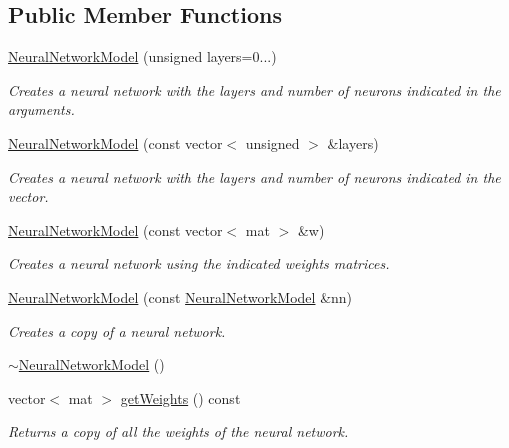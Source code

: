 \subsection*{Public Member Functions}
\begin{DoxyCompactItemize}
\item 
\hyperlink{classhappyml_1_1NeuralNetworkModel_a2ba8add6f01ebf3824967c43754ba96b}{Neural\+Network\+Model} (unsigned layers=0...)
\begin{DoxyCompactList}\small\item\em Creates a neural network with the layers and number of neurons indicated in the arguments. \end{DoxyCompactList}\item 
\hyperlink{classhappyml_1_1NeuralNetworkModel_a9db88c5a5fd88ab871f8237aab03b5ad}{Neural\+Network\+Model} (const vector$<$ unsigned $>$ \&layers)
\begin{DoxyCompactList}\small\item\em Creates a neural network with the layers and number of neurons indicated in the vector. \end{DoxyCompactList}\item 
\hyperlink{classhappyml_1_1NeuralNetworkModel_ad5359ce00a00346dab8433767f77988d}{Neural\+Network\+Model} (const vector$<$ mat $>$ \&w)
\begin{DoxyCompactList}\small\item\em Creates a neural network using the indicated weights matrices. \end{DoxyCompactList}\item 
\hyperlink{classhappyml_1_1NeuralNetworkModel_adadfa82c7b452789822dcb94ae5055d3}{Neural\+Network\+Model} (const \hyperlink{classhappyml_1_1NeuralNetworkModel}{Neural\+Network\+Model} \&nn)
\begin{DoxyCompactList}\small\item\em Creates a copy of a neural network. \end{DoxyCompactList}\item 
\hyperlink{classhappyml_1_1NeuralNetworkModel_a8ee4b9eae5590dc86f72e28c29fd1238}{$\sim$\+Neural\+Network\+Model} ()
\item 
vector$<$ mat $>$ \hyperlink{classhappyml_1_1NeuralNetworkModel_a9711fe856879e6e9db916ffd5479e136}{get\+Weights} () const 
\begin{DoxyCompactList}\small\item\em Returns a copy of all the weights of the neural network. \end{DoxyCompactList}\item 

\end{DoxyCompactItemize}
